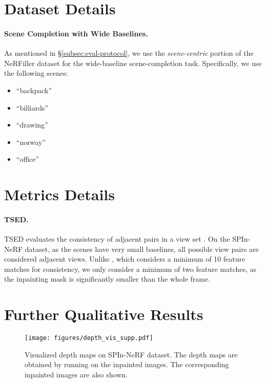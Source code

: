 \section{Dataset Details}
\label{supp:sec:dataset}

\paragraph{Scene Completion with Wide Baselines.}
As mentioned in \S\ref{subsec:eval-protocol}, we use the \textit{scene-centric} portion of the NeRFiller dataset for the wide-baseline scene-completion task. Specifically, we use the following scenes:

\begin{itemize}
    \item ``backpack''
    \item ``billiards''
    \item ``drawing''
    \item ``norway''
    \item ``office''
\end{itemize}

\section{Metrics Details}
\label{supp:sec:metrics}

\paragraph{TSED.}
TSED evaluates the consistency of adjacent pairs in a view set \cite{yu2023long}. On the SPIn-NeRF dataset, as the scenes have very small baselines, all possible view pairs are considered adjacent views. Unlike \cite{yu2023long}, which considers a minimum of 10 feature matches for consistency, we only consider a minimum of two feature matches, as the inpainting mask is significantly smaller than the whole frame.

\section{Further Qualitative Results}
\label{supp:sec:qualitative}

\begin{figure*}[t]
    \centering
    \texttt{[image: figures/depth\_vis\_supp.pdf]}
    \caption{Visualized depth maps on SPIn-NeRF dataset. The depth maps are obtained by running \duster on the inpainted images. The corresponding inpainted images are also shown.}
    \label{fig:depth-vis}
\end{figure*}

